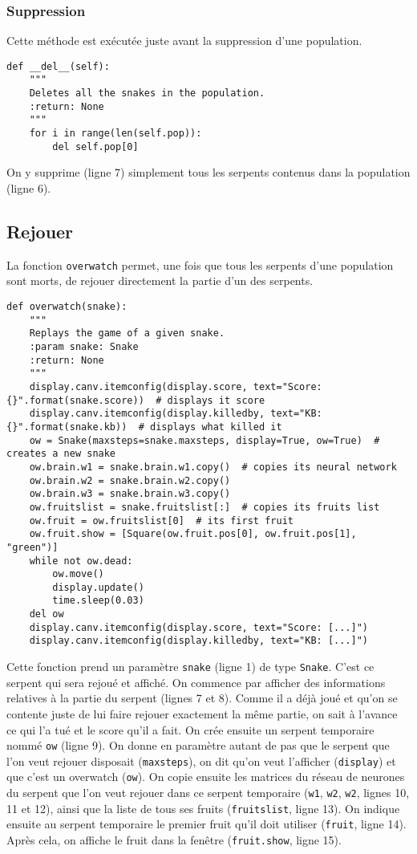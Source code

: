 \documentclass[12pt, a4paper, openany]{book}
\begin{document}
\subsubsection{Suppression}
Cette méthode est exécutée juste avant la suppression d'une population.
\begin{verbatim}
def __del__(self):
    """
    Deletes all the snakes in the population.
    :return: None
    """
    for i in range(len(self.pop)):
        del self.pop[0]
\end{verbatim}
On y supprime (ligne 7) simplement tous les serpents contenus dans la population (ligne 6).

\subsection{Rejouer}
\label{r:2.7.7}
La fonction \verb'overwatch' permet, une fois que tous les serpents d'une population sont morts, de rejouer directement la partie d'un des serpents.
\begin{verbatim}
def overwatch(snake):
    """
    Replays the game of a given snake.
    :param snake: Snake
    :return: None
    """
    display.canv.itemconfig(display.score, text="Score: {}".format(snake.score))  # displays it score
    display.canv.itemconfig(display.killedby, text="KB: {}".format(snake.kb))  # displays what killed it
    ow = Snake(maxsteps=snake.maxsteps, display=True, ow=True)  # creates a new snake
    ow.brain.w1 = snake.brain.w1.copy()  # copies its neural network
    ow.brain.w2 = snake.brain.w2.copy()
    ow.brain.w3 = snake.brain.w3.copy()
    ow.fruitslist = snake.fruitslist[:]  # copies its fruits list
    ow.fruit = ow.fruitslist[0]  # its first fruit
    ow.fruit.show = [Square(ow.fruit.pos[0], ow.fruit.pos[1], "green")]
    while not ow.dead:
        ow.move()
        display.update()
        time.sleep(0.03)
    del ow
    display.canv.itemconfig(display.score, text="Score: [...]")
    display.canv.itemconfig(display.killedby, text="KB: [...]")
\end{verbatim}
Cette fonction prend un paramètre \verb'snake' (ligne 1) de type \verb'Snake'. C'est ce serpent qui sera rejoué et affiché. On commence par afficher des informations relatives à la partie du serpent (lignes 7 et 8). Comme il a déjà joué et qu'on se contente juste de lui faire rejouer exactement la même partie, on sait \og{}à l'avance\fg{} ce qui l'a tué et le score qu'il a fait.\newline
On crée ensuite un serpent temporaire nommé \verb'ow' (ligne 9). On donne en paramètre autant de \og{}pas\fg{} que le serpent que l'on veut rejouer disposait (\verb'maxsteps'), on dit qu'on veut l'afficher (\verb'display') et que c'est un \og{}overwatch\fg{} (\verb'ow'). On copie ensuite les matrices du réseau de neurones du serpent que l'on veut rejouer dans ce serpent temporaire (\verb'w1', \verb'w2', \verb'w2', lignes 10, 11 et 12), ainsi que la liste de tous ses fruits (\verb'fruitslist', ligne 13). On indique ensuite au serpent temporaire le premier fruit qu'il doit utiliser (\verb'fruit', ligne 14). Après cela, on affiche le fruit dans la fenêtre (\verb'fruit.show', ligne 15).\newline
\end{document}
